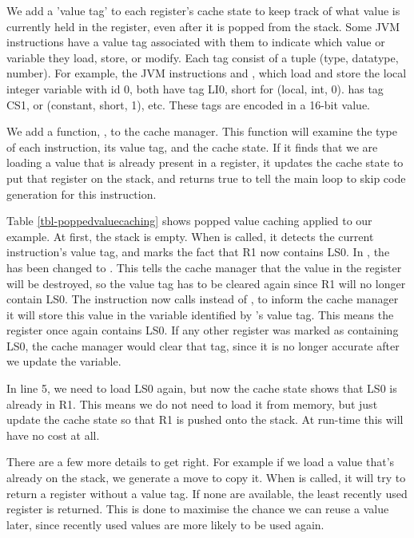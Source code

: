 

We add a 'value tag' to each register's cache state to keep track of what value is currently held in the register, even after it is popped from the stack. Some JVM instructions have a value tag associated with them to indicate which value or variable they load, store, or modify. Each tag consist of a tuple (type, datatype, number). For example, the JVM instructions  and , which load and store the local integer variable with id 0, both have tag LI0, short for (local, int, 0).  has tag CS1, or (constant, short, 1), etc. These tags are encoded in a 16-bit value.

We add a function, , to the cache manager. This function will examine the type of each instruction, its value tag, and the cache state. If it finds that we are loading a value that is already present in a register, it updates the cache state to put that register on the stack, and returns true to tell the main loop to skip code generation for this instruction.

Table \ref{tbl-poppedvaluecaching} shows popped value caching applied to our example. At first, the stack is empty. When  is called, it detects the current instruction's value tag, and marks the fact that R1 now contains LS0. In , the  has been changed to . This tells the cache manager that the value in the register will be destroyed, so the value tag has to be cleared again since R1 will no longer contain LS0. The  instruction now calls  instead of  , to inform the cache manager it will store this value in the variable identified by 's value tag. This means the register once again contains LS0. If any other register was marked as containing LS0, the cache manager would clear that tag, since it is no longer accurate after we update the variable.

In line 5, we need to load LS0 again, but now the cache state shows that LS0 is already in R1. This means we do not need to load it from memory, but just update the cache state so that R1 is pushed onto the stack. At run-time this  will have no cost at all.

There are a few more details to get right. For example if we load a value that's already on the stack, we generate a move to copy it. When  is called, it will try to return a register without a value tag. If none are available, the least recently used register is returned. This is done to maximise the chance we can reuse a value later, since recently used values are more likely to be used again.

